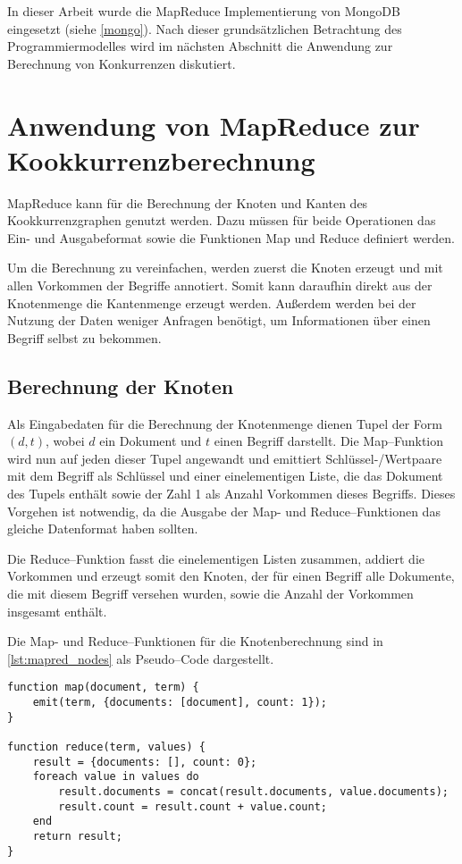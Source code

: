 In dieser Arbeit wurde die MapReduce Implementierung von MongoDB eingesetzt (siehe \cref{mongo}). Nach dieser grundsätzlichen Betrachtung des Programmiermodelles wird im nächsten Abschnitt die Anwendung zur Berechnung von Konkurrenzen diskutiert.

\section{Anwendung von MapReduce zur Kookkurrenzberechnung}
\label{mapreduce_cooccurence}

MapReduce kann für die Berechnung der Knoten und Kanten des Kookkurrenzgraphen genutzt werden. Dazu müssen für beide Operationen das Ein- und Ausgabeformat sowie die Funktionen Map und Reduce definiert werden.

Um die Berechnung zu vereinfachen, werden zuerst die Knoten erzeugt und mit allen Vorkommen der Begriffe annotiert. Somit kann daraufhin direkt aus der Knotenmenge die Kantenmenge erzeugt werden. Außerdem werden bei der Nutzung der Daten weniger Anfragen benötigt, um Informationen über einen Begriff selbst zu bekommen.

\subsection{Berechnung der Knoten}

Als Eingabedaten für die Berechnung der Knotenmenge dienen Tupel der Form \((d, t)\), wobei \(d\) ein Dokument und \(t\) einen Begriff darstellt. Die Map--Funktion wird nun auf jeden dieser Tupel angewandt und emittiert Schlüssel-/Wertpaare mit dem Begriff als Schlüssel und einer einelementigen Liste, die das Dokument des Tupels enthält sowie der Zahl \num{1} als Anzahl Vorkommen dieses Begriffs. Dieses Vorgehen ist notwendig, da die Ausgabe der Map- und Reduce--Funktionen das gleiche Datenformat haben sollten.

Die Reduce--Funktion fasst die einelementigen Listen zusammen, addiert die Vorkommen und erzeugt somit den Knoten, der für einen Begriff alle Dokumente, die mit diesem Begriff versehen wurden, sowie die Anzahl der Vorkommen insgesamt enthält.

Die Map- und Reduce--Funktionen für die Knotenberechnung sind in \cref{lst:mapred_nodes} als Pseudo--Code dargestellt.

\begin{lstlisting}[language=pseudo, label={lst:mapred_nodes}, caption={Knotenerzeugung mit MapReduce}]
function map(document, term) {
    emit(term, {documents: [document], count: 1});
}

function reduce(term, values) {
    result = {documents: [], count: 0};
    foreach value in values do
        result.documents = concat(result.documents, value.documents);
        result.count = result.count + value.count;
    end
    return result;
}
\end{lstlisting}

